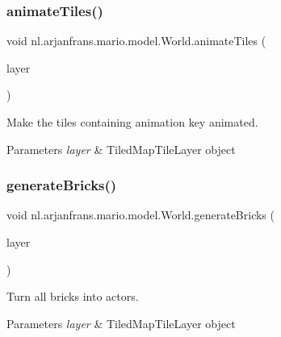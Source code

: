 \subsubsection{\texorpdfstring{animate\+Tiles()}{animateTiles()}}
{\footnotesize\ttfamily void nl.\+arjanfrans.\+mario.\+model.\+World.\+animate\+Tiles (\begin{DoxyParamCaption}\item[{Tiled\+Map\+Tile\+Layer}]{layer }\end{DoxyParamCaption})\hspace{0.3cm}{\ttfamily [private]}}

Make the tiles containing \textquotesingle{}animation\textquotesingle{} key animated. 
\begin{DoxyParams}{Parameters}
{\em layer} & Tiled\+Map\+Tile\+Layer object \\
\hline
\end{DoxyParams}
\mbox{\label{classnl_1_1arjanfrans_1_1mario_1_1model_1_1World_a8d330159c1694a0ccd3cb7304adfe9bb}} 
\subsubsection{\texorpdfstring{generate\+Bricks()}{generateBricks()}}
{\footnotesize\ttfamily void nl.\+arjanfrans.\+mario.\+model.\+World.\+generate\+Bricks (\begin{DoxyParamCaption}\item[{Tiled\+Map\+Tile\+Layer}]{layer }\end{DoxyParamCaption})\hspace{0.3cm}{\ttfamily [private]}}

Turn all bricks into actors. 
\begin{DoxyParams}{Parameters}
{\em layer} & Tiled\+Map\+Tile\+Layer object \\
\hline
\end{DoxyParams}
\mbox{\label{classnl_1_1arjanfrans_1_1mario_1_1model_1_1World_ae0be61c4e82de092bab3e6c7a9e04383}} 
